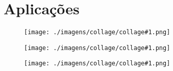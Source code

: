 \section{Aplicações}

\newcommand{\aplicacao}[1]{
	\begin{frame}
		\begin{figure}
			\centering
			\texttt{[image: ./imagens/collage/collage\#1.png]}
		\end{figure}
	\end{frame}
}

\aplicacao{0}
\aplicacao{1}
\aplicacao{2}
